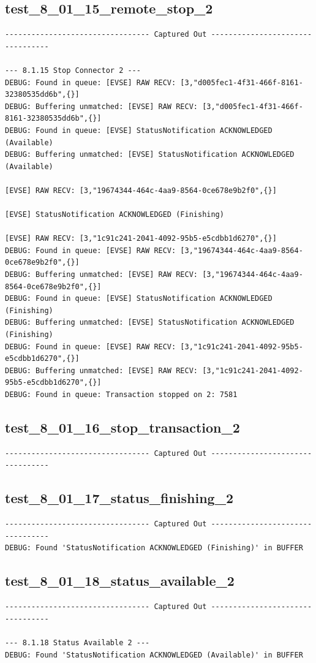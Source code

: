 \documentclass{article}
\begin{document}
\subsection*{test\_8\_01\_15\_remote\_stop\_2}
\begin{lstlisting}
--------------------------------- Captured Out ---------------------------------

--- 8.1.15 Stop Connector 2 ---
DEBUG: Found in queue: [EVSE] RAW RECV: [3,"d005fec1-4f31-466f-8161-32380535dd6b",{}]
DEBUG: Buffering unmatched: [EVSE] RAW RECV: [3,"d005fec1-4f31-466f-8161-32380535dd6b",{}]
DEBUG: Found in queue: [EVSE] StatusNotification ACKNOWLEDGED (Available)
DEBUG: Buffering unmatched: [EVSE] StatusNotification ACKNOWLEDGED (Available)

[EVSE] RAW RECV: [3,"19674344-464c-4aa9-8564-0ce678e9b2f0",{}]

[EVSE] StatusNotification ACKNOWLEDGED (Finishing)

[EVSE] RAW RECV: [3,"1c91c241-2041-4092-95b5-e5cdbb1d6270",{}]
DEBUG: Found in queue: [EVSE] RAW RECV: [3,"19674344-464c-4aa9-8564-0ce678e9b2f0",{}]
DEBUG: Buffering unmatched: [EVSE] RAW RECV: [3,"19674344-464c-4aa9-8564-0ce678e9b2f0",{}]
DEBUG: Found in queue: [EVSE] StatusNotification ACKNOWLEDGED (Finishing)
DEBUG: Buffering unmatched: [EVSE] StatusNotification ACKNOWLEDGED (Finishing)
DEBUG: Found in queue: [EVSE] RAW RECV: [3,"1c91c241-2041-4092-95b5-e5cdbb1d6270",{}]
DEBUG: Buffering unmatched: [EVSE] RAW RECV: [3,"1c91c241-2041-4092-95b5-e5cdbb1d6270",{}]
DEBUG: Found in queue: Transaction stopped on 2: 7581
\end{lstlisting}
\subsection*{test\_8\_01\_16\_stop\_transaction\_2}
\begin{lstlisting}
--------------------------------- Captured Out ---------------------------------
\end{lstlisting}
\subsection*{test\_8\_01\_17\_status\_finishing\_2}
\begin{lstlisting}
--------------------------------- Captured Out ---------------------------------
DEBUG: Found 'StatusNotification ACKNOWLEDGED (Finishing)' in BUFFER
\end{lstlisting}
\subsection*{test\_8\_01\_18\_status\_available\_2}
\begin{lstlisting}
--------------------------------- Captured Out ---------------------------------

--- 8.1.18 Status Available 2 ---
DEBUG: Found 'StatusNotification ACKNOWLEDGED (Available)' in BUFFER
\end{lstlisting}
\end{document}

